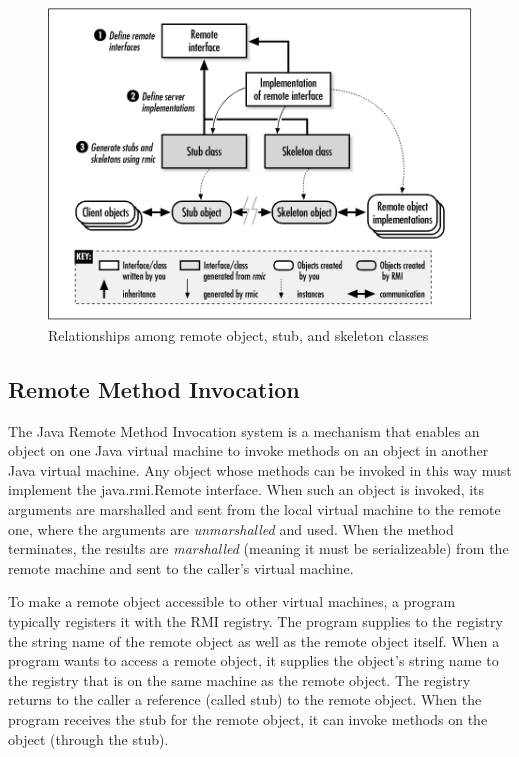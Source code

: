 \begin{figure}[ht!]
\centering
\includegraphics[width=150mm]{img/remote_object_relationship.png}
\caption{Relationships among remote object, stub, and skeleton classes}
\label{Remote Object relationship}
\end{figure}

\subsection{Remote Method Invocation}
The Java Remote Method Invocation system is a mechanism that enables an object on one Java virtual machine to invoke methods on an object in another Java virtual machine. Any object whose methods can be invoked in this way must implement the java.rmi.Remote interface. When such an object is invoked, its arguments are marshalled and sent from the local virtual machine to the remote one, where the arguments are \emph{unmarshalled} and used. When the method terminates, the results are \emph{marshalled} (meaning it must be serializeable) from the remote machine and sent to the caller's virtual machine.

To make a remote object accessible to other virtual machines, a program typically registers it with the RMI registry. The program supplies to the registry the string name of the remote object as well as the remote object itself. When a program wants to access a remote object, it supplies the object's string name to the registry that is on the same machine as the remote object. The registry returns to the caller a reference (called stub) to the remote object. When the program receives the stub for the remote object, it can invoke methods on the object (through the stub).